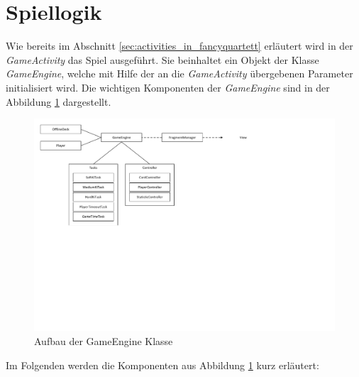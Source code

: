 \section{Spiellogik}

Wie bereits im Abschnitt \ref{sec:activities_in_fancyquartett} erläutert wird in der \emph{GameActivity} das Spiel ausgeführt. Sie beinhaltet ein Objekt der Klasse \emph{GameEngine}, welche mit Hilfe der an die \emph{GameActivity} übergebenen Parameter initialisiert wird. Die wichtigen Komponenten der \emph{GameEngine} sind in der Abbildung \ref{fig:architecture_gameengine} dargestellt.

\begin{figure}[ht]
\centering
    \includegraphics[trim=0 280 220 0,width=\textwidth]{../img/ArchitekturGameengine.pdf}
    \caption{Aufbau der GameEngine Klasse}
    \label{fig:architecture_gameengine}
\end{figure}

Im Folgenden werden die Komponenten aus Abbildung \ref{fig:architecture_gameengine} kurz erläutert:

